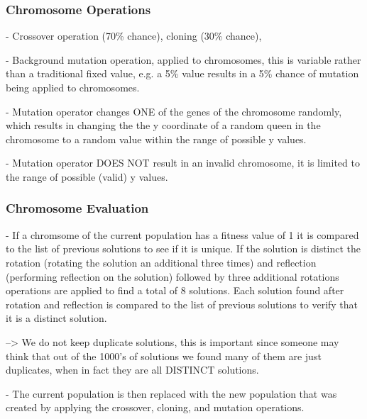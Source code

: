 \documentclass{sig-alternate}
\begin{document}
\subsubsection{Chromosome Operations}
- Crossover operation (70\% chance), cloning (30\% chance), 

- Background mutation operation, applied to chromosomes, this is variable rather
  than a traditional fixed value, e.g. a 5\% value results in a 5\% chance of
  mutation being applied to chromosomes.

- Mutation operator changes ONE of the genes of the chromosome randomly, which
  results in changing the the y coordinate of a random queen in the chromosome 
  to a random value within the range of possible y values.

- Mutation operator DOES NOT result in an invalid chromosome, it is limited to the
  range of possible (valid) y values.


\subsubsection{Chromosome Evaluation}
- If a chromsome of the current population has a fitness value of 1 it is compared 
  to the list of previous solutions to see if it is unique. If the solution is 
  distinct the rotation (rotating the solution an additional three times) and 
  reflection (performing reflection on the solution) followed by three additional
  rotations operations are applied to find a total of 8 solutions. Each solution 
  found after rotation and reflection is compared to the list of previous solutions to 
  verify that it is a distinct solution.

  --> We do not keep duplicate solutions, this is important since someone may think
      that out of the 1000's of solutions we found many of them are just duplicates,
      when in fact they are all DISTINCT solutions.

- The current population is then replaced with the new population that was created
  by applying the crossover, cloning, and mutation operations.


\end{document}
